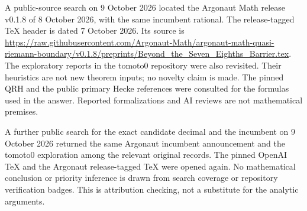 \documentclass[12pt]{article}
\begin{document}
A public-source search on 9 October 2026 located the Argonaut Math
release v0.1.8 of 8 October 2026, with the same incumbent rational.
The release-tagged TeX header is dated 7 October 2026.  Its source is
\url{https://raw.githubusercontent.com/Argonaut-Math/argonaut-math-quasi-riemann-boundary/v0.1.8/preprints/Beyond_the_Seven_Eighths_Barrier.tex}.
The exploratory reports in the tomoto0 repository were also revisited.
Their heuristics are not new theorem inputs; no novelty claim is made.
The pinned QRH and the public primary Hecke references were consulted
for the formulas used in the answer.  Reported formalizations and
AI reviews are not mathematical premises.

A further public search for the exact candidate decimal and the incumbent
on 9 October 2026 returned the same Argonaut incumbent announcement and
the tomoto0 exploration among the relevant original records.  The pinned
OpenAI TeX and the Argonaut release-tagged TeX were opened again.
No mathematical conclusion or priority inference is drawn from search
coverage or repository verification badges.  This is attribution
checking, not a substitute for the analytic arguments.
\end{document}
